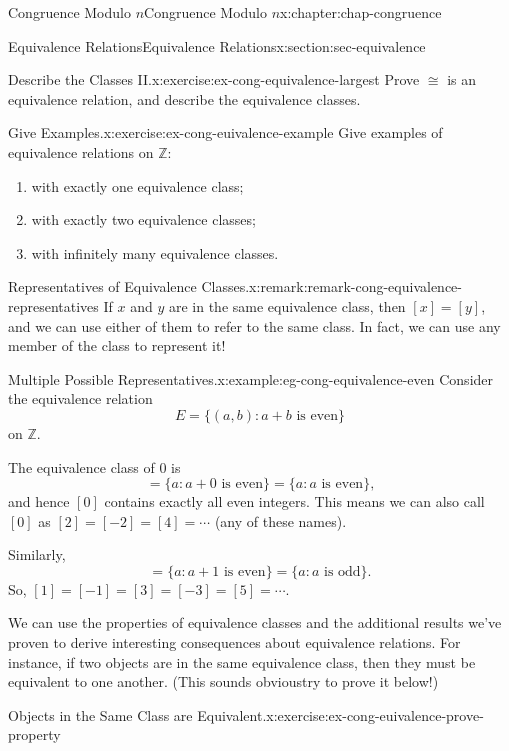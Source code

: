 \documentclass[oneside,10pt,]{book}
\numberwithin{equation}{section}
\begin{document}
\begin{chapterptx}{Congruence Modulo \(n\)}{}{Congruence Modulo \(n\)}{}{}{x:chapter:chap-congruence}
\begin{sectionptx}{Equivalence Relations}{}{Equivalence Relations}{}{}{x:section:sec-equivalence}
\begin{inlineexercise}{Describe the Classes II.}{x:exercise:ex-cong-equivalence-largest}
Prove \(\cong\) is an equivalence relation, and describe the equivalence classes.%
\end{inlineexercise}%
\begin{inlineexercise}{Give Examples.}{x:exercise:ex-cong-euivalence-example}%
Give examples of equivalence relations on \(\mathbb{Z}\):%
\begin{enumerate}[label=(\alph*)]
\item{}with exactly one equivalence class;%
\item{}with exactly two equivalence classes;%
\item{}with infinitely many equivalence classes.%
\end{enumerate}
%
\end{inlineexercise}%
\begin{remark}{Representatives of Equivalence Classes.}{x:remark:remark-cong-equivalence-representatives}%
If \(x\) and \(y\) are in the same equivalence class, then \([x] = [y]\), and we can use either of them to refer to the same class. In fact, we can use any member of the class to represent it!%
\end{remark}
\begin{example}{Multiple Possible Representatives.}{x:example:eg-cong-equivalence-even}%
Consider the equivalence relation%
\begin{equation*}
E = \{(a,b) : a + b \text{ is even}\}
\end{equation*}
on \(\mathbb{Z}\).%
\par
The equivalence class of \(0\) is%
\begin{equation*}
[0] = \{a : a + 0 \text{ is even}\} = \{a : a \text{ is even}\}\text{,}
\end{equation*}
and hence \([0]\) contains exactly all even integers. This means we can also call \([0]\) as \([2] = [-2] = [4] = \cdots\) (any of these names).%
\par
Similarly,%
\begin{equation*}
[1] = \{a : a + 1 \text{ is even}\} = \{ a : a \text{ is odd}\}\text{.}
\end{equation*}
So, \([1] = [-1] = [3] = [-3] = [5] = \cdots\).%
\end{example}
We can use the properties of equivalence classes and the additional results we've proven to derive interesting consequences about equivalence relations. For instance, if two objects are in the same equivalence class, then they must be equivalent to one another. (This sounds obvious\textemdash{}try to prove it below!)%
\begin{inlineexercise}{Objects in the Same Class are Equivalent.}{x:exercise:ex-cong-euivalence-prove-property}%

\end{inlineexercise}
\end{sectionptx}
\end{chapterptx}
\end{document}
